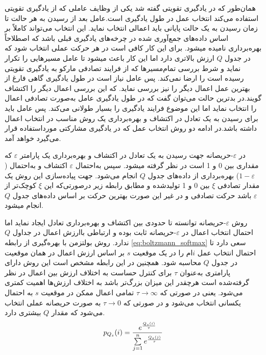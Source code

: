 همان‌طور که در یادگیری تقویتی گفته شد یکی از وظایف عاملی که از یادگیری تقویتی استفاده می‌کند انتخاب عمل در طول یادگیری است.عامل بعد از رسیدن به هر حالت تا زمان رسیدن به یک حالت پایانی باید اعمالی انتخاب نماید. این انتخاب می‌تواند کاملاً بر اساس داده‌های جمع‌آوری شده در چرخه‌های یادگیری قبلی باشد که اصطلاحاً بهره‌برداری نامیده میشود. برای این کار کافی است در هر حرکت عملی انتخاب شود که در جدول $Q$ ارزش بالاتری دارد اما این کار باعث میشود تا عامل مسیرهایی را تکرار نماید و شرط بررسی تمام‌مسیرها که از فرایند تصادفی مارکو به یادگیری تقویتی رسیده است را ارضا نمی‌کند. پس عامل نیاز است در طول یادگیری گاهی فارغ از بهترین عمل اعمال دیگر را نیز بررسی نماید. که این بررسی اعمال دیگر را اکتشاف گویند.در بدترین حالت می‌توان گفت که در طول یادگیری عامل به‌صورت تصادفی اعمال را انتخاب نماید اما این موضوع فرایند یادگیری را بسیار طولانی می‌کند. پس عامل باید برای رسیدن به یک تعادل در اکتشاف و بهره‌برداری یک روش مناسب در انتخاب اعمال داشته باشد.در ادامه دو روش انتخاب عمل که در یادگیری مشارکتی مورداستفاده قرار می‌گیرد خواهد آمد.

در $\varepsilon$-حریصانه جهت رسیدن به یک تعادل در اکتشاف و بهره‌برداری یک پارامتر $\varepsilon$ که مقداری بین 0 و 1 است در نظر گرفته میشود. سپس به‌احتمال $\varepsilon$ اکتشاف و به‌احتمال
($1 - \varepsilon$)
بهره‌برداری از داده‌های جدول $Q$ انجام می‌شود. جهت پیاده‌سازی این روش یک مقدار تصادفی  $\xi$ بین 0 و 1 تولیدشده و مطابق رابطه زیر درصورتی‌که این $\xi$ کوچک‌تر از $\varepsilon$ باشد حرکت تصادفی و در غیر این صورت بهترین حرکت بر اساس داده‌های جدول $Q$ انجام میشود.

روش $\varepsilon$-حریصانه توانسته تا حدودی بین اکتشاف و بهره‌برداری تعادل ایجاد نماید اما احتمال انتخاب اعمال در $\varepsilon$-حریصانه ثابت بوده و ارتباطی باارزش اعمال در جداول $Q$ ندارد. روش بولتزمن با بهره‌گیری از رابطه \ref{eq:boltzmann_softmax} سعی دارد تا احتمال انتخاب عمل $i$ام را در یک موقعیت $s$ بر اساس ارزش اعمال در همان موقعیت در جدول $Q$ محاسبه شود. همچنین در این رابطه مشخص است این روش دارای پارامتری به‌عنوان $\tau$ برای کنترل حساست به اختلاف ارزش بین اعمال در نظر گرفته‌شده است هرچقدر این میزان بزرگ‌تر باشد به اختلاف ارزش‌ها اهمیت کمتری می‌شود. یعنی در صورتی که $\tau \rightarrow \infty$ تمامی اعمال ممکن در موقعیت $s$ به احتمال یکسانی انتخاب می‌شود و در صورتی که $\tau \rightarrow 0$ به صورت حریصانه عملی انتخاب می‌شود که مقدار $Q$ بیشتری دارد.
\begin{equation}\label{eq:boltzmann_softmax}
p_{Q_s}(i) = {e^{Q_s(i) \over \tau} \over \sum\limits_{j = 1}^n e^{Q_s(j) \over \tau}}
\end{equation}